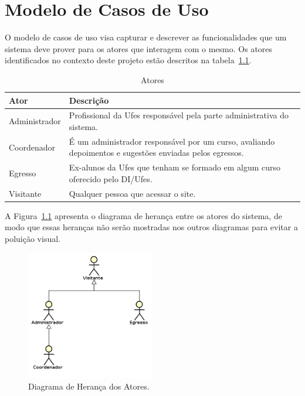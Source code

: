 \chapter{Modelo de Casos de Uso}
\label{sec-caso-de-uso}

                                      \renewcommand*\theuccount{UC-\arabic{uccount}}
\newcommand*\UC{\refstepcounter{uccount}\theuccount}      \setcounter{uccount}{0}

O modelo de casos de uso visa capturar e descrever as funcionalidades que um sistema deve prover para os atores que interagem com o mesmo. Os atores identificados no contexto deste projeto estão descritos na tabela~\ref{tabela-atores}.

\begin{table}[h]
	\centering \vspace{0.5cm} \caption{ Atores}
	\begin{tabular}{|p{3cm}|p{12cm}|} \hline \rowcolor[rgb]{0.8,0.8,0.8}
 		Ator & Descrição \\\hline                              
		Administrador & Profissional da Ufes responsável pela parte administrativa do sistema. \\\hline   
		Coordenador & É um administrador responsável por um curso, avaliando depoimentos e sugestões enviadas pelos egressos. \\\hline                              
		Egresso & Ex-alunos da Ufes que tenham se formado em algum curso oferecido pelo DI/Ufes. \\\hline                              
		Visitante & Qualquer pessoa que acessar o site. \\\hline 		 
	\end{tabular}
	\label{tabela-atores}	
\end{table}



A Figura~\ref{figura-caso-de-uso-atores} apresenta o diagrama de herança entre os atores do sistema, de modo que essas heranças não serão mostradas nos outros diagramas para evitar a poluição visual.

\begin{figure}[h!]
	\centering
	\includegraphics[width=0.5\textwidth]{figuras/atoresHeranca}
 	\caption{Diagrama de Herança dos Atores.}
 	\label{figura-caso-de-uso-atores}
\end{figure}


